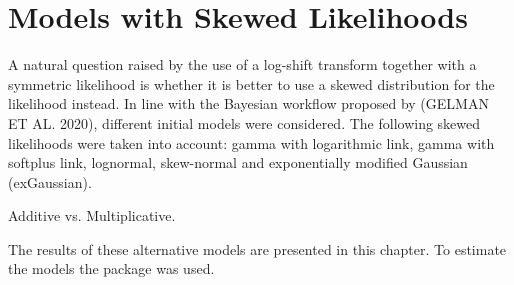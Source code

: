 \section{Models with Skewed Likelihoods}

A natural question raised by the use of a log-shift transform together with a symmetric likelihood is whether it is better to use a skewed distribution for the likelihood instead.
In line with the Bayesian workflow proposed by (GELMAN ET AL. 2020), different initial models were considered.
The following skewed likelihoods were taken into account: gamma with logarithmic link, gamma with
softplus link, lognormal, skew-normal and exponentially modified Gaussian (exGaussian).

Additive vs. Multiplicative.

The results of these alternative models are presented in this chapter.
To estimate the models the package  was used.

